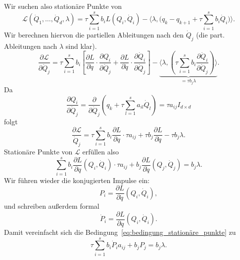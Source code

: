 Wir suchen also stationäre Punkte von
\begin{equation*}
\mathcal{L}(\dot{Q}_1,\hdots,\dot{Q}_d,\lambda)
=
\tau \sum_{i=1}^s b_iL(Q_i,\dot{Q}_i)
 - \Big\langle \lambda, \Big( q_k - q_{k+1} + \tau\sum_{i=1}^s b_i\dot{Q}_i \Big) \Big\rangle.
\end{equation*}
Wir berechnen hiervon die partiellen Ableitungen nach den $\dot{Q}_j$ (die part. Ableitungen nach $\lambda$ sind klar).
\begin{equation*}
\frac{\partial\mathcal{L}}{\partial\dot{Q}_j}
 = \tau\sum_{i=1}^s b_i \left[\frac{\partial L}{\partial q}\cdot \frac{\partial Q_i}{\partial\dot{Q}_j}
   +  \frac{\partial L}{\partial \dot q}\cdot \frac{\partial \dot Q_i}{\partial\dot{Q}_j}\right]
   - \underbrace{\bigg\langle \lambda, \left( \tau\sum_{i=1}^s b_i \frac{\partial\dot{Q}_i}{\partial\dot{Q}_j}\right) \bigg\rangle}_{= \tau b_j \lambda}.
\end{equation*}
Da
\begin{equation*}
\frac{\partial Q_i}{\partial \dot{Q}_j}
=
\frac{\partial}{\partial \dot{Q}_j}\left( q_k+\tau \sum_{l=1}^s a_{il}\dot{Q}_l\right)
=
\tau a_{ij} I_{d\times d}
\end{equation*}
folgt
\begin{equation*}
\frac{\partial\mathcal{L}}{\dot{Q}_j} = \tau\sum_{i=1}^s b_i \frac{\partial L}{\partial q}\cdot \tau a_{ij} + \tau b_j\frac{\partial L}{\partial\dot{q}} - \tau b_j\lambda.
\end{equation*}
Stationäre Punkte von $\mathcal{L}$ erfüllen also
\begin{equation}
 \label{eq:bedingung_stationäre_punkte}
\sum_{i=1}^s b_i\frac{\partial L}{\partial q}(Q_i,\dot{Q}_i)\cdot\tau a_{ij} + b_j\frac{\partial L}{\partial \dot{q}}(Q_j,\dot{Q}_j) = b_j\lambda.
\end{equation}
Wir führen wieder die konjugierten Impulse ein:
\begin{equation*}
P_i = \frac{\partial L}{\partial\dot{q}}(Q_i,\dot{Q}_i),
\end{equation*}
und schreiben außerdem formal
\begin{equation*}
\dot{P}_i = \frac{\partial L}{\partial q}(Q_i,\dot{Q}_i).
\end{equation*}
Damit vereinfacht sich die Bedingung~\eqref{eq:bedingung_stationäre_punkte} zu
\begin{equation}
\label{eq:bedingung_stationäre_punkte_einfach}
\tau\sum_{i=1}^s b_i\dot{P}_i a_{ij} + b_jP_j = b_j\lambda.
\end{equation}

